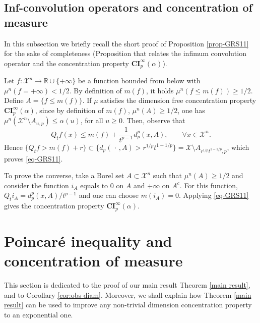 \documentclass[11pt]{amsart}
\numberwithin{equation}{section}
\begin{document}
\subsection{Inf-convolution operators and concentration of measure}\label{link}

In this subsection we briefly recall the short proof of Proposition \ref{prop-GRS11} for the sake of completeness
 (Proposition that relates the infimum convolution operator and the concentration property $\mathbf{CI}_p^\infty(\alpha)$).
 
 
\proof Let $f:{\mathcal{X}}^n \to {\mathbb{R}}\cup\{+\infty\}$ be a function bounded from below with   $\mu^n(f=+\infty)<1/2$. By definition of $m(f)$, it holds $\mu^n(f\leq m(f)) \geq 1/2.$ Define $A=\{f \leq m(f)\}$. 
If $\mu$ satisfies the dimension free concentration property $\mathbf{CI}_p^\infty(\alpha)$, since by definition of $m(f)$, $\mu^n(A)\geq1/2$, one has  $\mu^n({\mathcal{X}}^n \setminus A_{u,p}) \leq \alpha(u)$, for all $u\geq0.$ Then, observe that 
\[
Q_tf(x) \leq m(f) + \frac{1}{t^{p-1}}d^p_p(x,A),\qquad \forall x\in {\mathcal{X}}^n.
\]
Hence $\{Q_tf>m(f)+r\}\subset \{d_p(\,\cdot\,,A)>{r^{1/p}t^{1-1/p}}\} = {\mathcal{X}}\setminus A_{r^{1/p}t^{1-1/p},p}$, which proves \eqref{eq-GRS11}.

To prove the converse, take a Borel set $A \subset {\mathcal{X}}^n$ such that $\mu^n(A)\geq 1/2$ and consider the function $i_A$ equals to $0$ on $A$ and $+\infty$ on $A^c.$ For this function, $Q_ti_A=d_p^p(x,A)/t^{p-1}$ and one can choose $m(i_A)=0.$ Applying \eqref{eq-GRS11} gives the concentration property $\mathbf{CI}_p^\infty(\alpha)$.
\endproof

\section{Poincar\'e inequality and concentration of measure}

This section is dedicated to the proof of our main result Theorem \ref{main result}, and to Corollary 
\ref{cor:obs diam}. Moreover, we shall explain how Theorem \ref{main result} can be used to improve
any non-trivial dimension concentration property to an exponential one.
\end{document}

